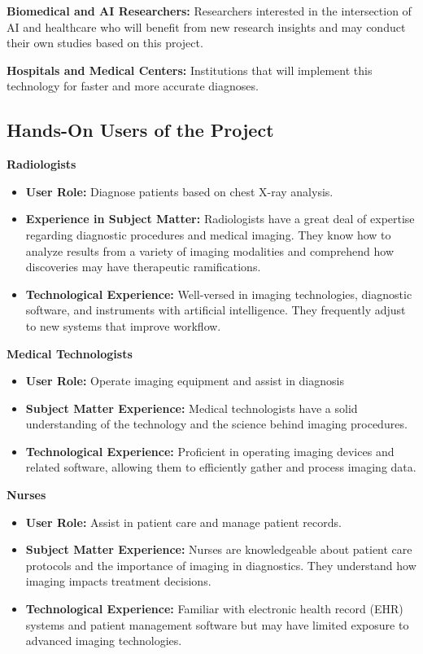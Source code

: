 \documentclass[12pt]{article}
\begin{document}
\textbf{Biomedical and AI Researchers: } Researchers interested in the intersection of AI and 
healthcare who will benefit from new research insights and may conduct their own studies based on 
this project.

\textbf{Hospitals and Medical Centers:} Institutions that will implement this technology for 
faster and more accurate diagnoses.

\subsection{Hands-On Users of the Project}

\textbf{Radiologists}
\begin{itemize}
    \item {\textbf{User Role: } Diagnose patients based on chest X-ray analysis.}
    \item {
        \textbf{Experience in Subject Matter: } Radiologists have a great deal of expertise 
        regarding diagnostic procedures and medical imaging. They know how to analyze results from
         a variety of imaging modalities and comprehend how discoveries may have therapeutic 
        ramifications.
    }
    \item {
        \textbf{Technological Experience: } Well-versed in imaging technologies, diagnostic software, and instruments with artificial intelligence. They frequently adjust to new systems that improve workflow.
    }
\end{itemize}

\textbf{Medical Technologists}
\begin{itemize}
    \item {\textbf{User Role: } Operate imaging equipment and assist in diagnosis}
    \item {
        \textbf{Subject Matter Experience: } Medical technologists have a solid understanding 
        of the technology and the science behind imaging procedures.
    }
    \item {
        \textbf{Technological Experience: } Proficient in operating imaging devices and related 
        software, allowing them to efficiently gather and process imaging data.
    }
\end{itemize}

\textbf{Nurses}
\begin{itemize}
    \item {\textbf{User Role: } Assist in patient care and manage patient records.}
    \item {
        \textbf{Subject Matter Experience: } Nurses are knowledgeable about patient care protocols
         and the importance of imaging in diagnostics. They understand how imaging impacts 
         treatment decisions.
    }
    \item {
        \textbf{Technological Experience: } Familiar with electronic health record (EHR) systems 
        and patient management software but may have limited exposure to advanced imaging 
        technologies.
    }
\end{itemize}
\end{document}
